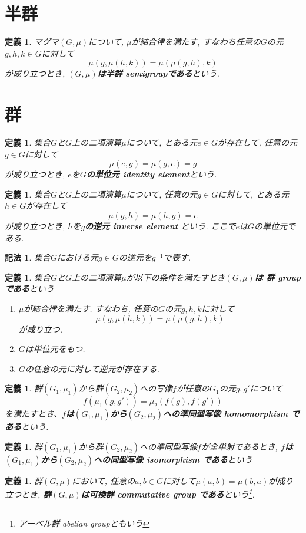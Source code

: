 \documentclass[dvipdfmx]{jsbook}
\theoremstyle{plain}
\newtheorem{Def}[thm]{定義}
\newtheorem{Notation}[thm]{記法}
\begin{document}
\section{半群}
\begin{Def}
マグマ$(G,\mu)$について,
$\mu$が結合律を満たす, すなわち任意の$G$の元$g,h,k\in G$に対して\[\mu(g,\mu(h,k))=\mu(\mu(g,h),k)\]
が成り立つとき, {\bf $(G,\mu)$は半群 semigroupである}という.
\end{Def}
\section{群}
\begin{Def}
集合$G$と$G$上の二項演算$\mu$について, とある元$e\in G$が存在して, 任意の元$g\in G$に対して\[\mu(e,g)=\mu(g,e)=g\]が成り立つとき, $e$を{\bf $G$の単位元 identity element}という.
\end{Def}
\begin{Def}
集合$G$と$G$上の二項演算$\mu$について, 任意の元$g\in G$に対して, とある元$h\in G$が存在して \[\mu(g,h)=\mu(h,g)=e\]が成り立つとき, $h$を{\bf $g$の逆元 inverse element }という.
ここで$e$は$G$の単位元である.
\end{Def}
\begin{Notation}
集合$G$における元$g\in G$の逆元を$g^{-1}$で表す.
\end{Notation}
\begin{Def}
集合$G$と$G$上の二項演算$\mu$が以下の条件を満たすとき{\bf$(G,\mu)$は 群 group である}という
\begin{enumerate}
\item $\mu$が結合律を満たす. すなわち, 任意の$G$の元$g,h,k$に対して\[\mu(g,\mu(h,k))=\mu(\mu(g,h),k)\]が成り立つ.
\item $G$は単位元をもつ.
\item $G$の任意の元に対して逆元が存在する.
\end{enumerate}
\end{Def}
\begin{Def}
群$(G_1,\mu_1)$から群$(G_2,\mu_2)$への写像$f$が任意の$G_1$の元$g, g'$について \[f(\mu_1(g,g')) = \mu_2(f(g),f(g'))\] を満たすとき、{\bf $f$は$(G_1,\mu_1)$から$(G_2,\mu_2)$への準同型写像 homomorphism である}という.
\end{Def}
\begin{Def}
群$(G_1,\mu_1)$から群$(G_2,\mu_2)$への準同型写像$f$が全単射であるとき,
{\bf $f$は$(G_1,\mu_1)$から$(G_2,\mu_2)$への同型写像 isomorphism である}という
\end{Def}
\begin{Def}
群$(G,\mu)$において,
任意の$a,b\in G$に対して$\mu(a,b)=\mu(b,a)$が成り立つとき,
{\bf 群$(G,\mu)$は可換群 commutative group である}という\footnote{アーベル群 abelian groupともいう}.
\end{Def}
\end{document}
